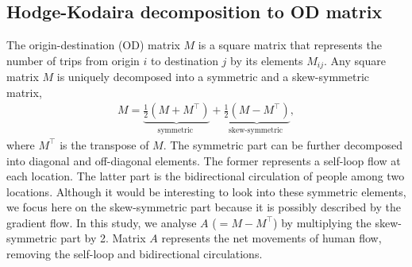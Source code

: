 \documentclass[]{article}
\begin{document}
\subsection*{Hodge-Kodaira decomposition to OD matrix}

The origin-destination (OD) matrix $M$ is a square matrix that represents the number of trips from origin $i$ to destination $j$ by its elements $M_{ij}$.
Any square matrix $M$ is uniquely decomposed into a symmetric and a skew-symmetric matrix,
\begin{align}
  M = \underbrace{\frac{1}{2} \left( M + M^{\intercal} \right) }_{\text{symmetric }}
  + \underbrace{\frac{1}{2} \left( M - M^{\intercal} \right) }_{\text{skew-symmetric }},
  \label{eq:symm}
\end{align}
where $M^{\intercal}$ is the transpose of $M$.
The symmetric part can be further decomposed into diagonal and off-diagonal elements.
The former represents a self-loop flow at each location.
The latter part is the bidirectional circulation of people among two locations.
Although it would be interesting to look into these symmetric elements,
we focus here on the skew-symmetric part because it is possibly described by the gradient flow.
In this study, we analyse  $A$ ($= M - M^{\intercal}$) by multiplying the skew-symmetric part by 2.
Matrix $A$ represents the net movements of human flow, removing the self-loop and bidirectional circulations.
\end{document}
